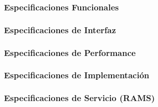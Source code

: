 \subsubsection{Especificaciones Funcionales}

\subsubsection{Especificaciones de Interfaz}

\subsubsection{Especificaciones de Performance}

\subsubsection{Especificaciones de Implementación}

\subsubsection{Especificaciones de Servicio (RAMS)}